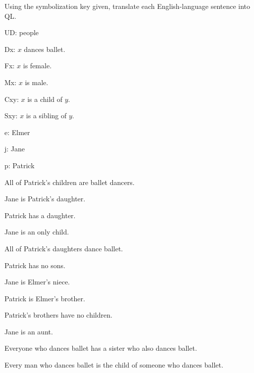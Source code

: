 \solutions
\problempart
\label{pr.QLballet}
Using the symbolization key given, translate each English-language sentence into QL.
\begin{ekey}
\item[UD:] people
\item[Dx:] $x$ dances ballet.
\item[Fx:] $x$ is female.
\item[Mx:] $x$ is male.
\item[Cxy:] $x$ is a child of $y$.
\item[Sxy:] $x$ is a sibling of $y$.
\item[e:] Elmer
\item[j:] Jane
\item[p:] Patrick
\end{ekey}
\begin{earg}
\item All of Patrick's children are ballet dancers.
\item Jane is Patrick's daughter.
\item Patrick has a daughter.
\item Jane is an only child.
\item All of Patrick's daughters dance ballet.
\item Patrick has no sons.
\item Jane is Elmer's niece.
\item Patrick is Elmer's brother.
\item Patrick's brothers have no children.
\item Jane is an aunt.
\item Everyone who dances ballet has a sister who also dances ballet.
\item Every man who dances ballet is the child of someone who dances ballet.
\end{earg}

